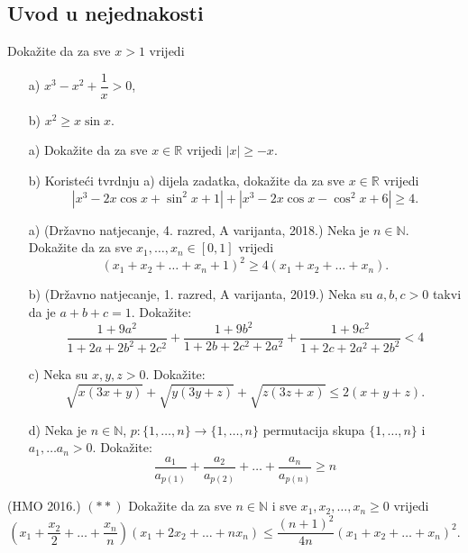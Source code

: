 \subsection*{Uvod u nejednakosti}
\begin{exercise}
Dokažite da za sve $x>1$ vrijedi 
\begin{itemize}
\item[a)] $x^3-x^2+\dfrac{1}{x}>0$,
\item[b)] $x^2\geq x\sin{x}$.
\end{itemize}
\end{exercise}
\begin{exercise} \textbf{}
\begin{itemize}
\item[a)] Dokažite da za sve $x\in \mathbb{R}$ vrijedi $|x|\geq -x$.
\item[b)] Koristeći tvrdnju a) dijela zadatka, dokažite da za sve $x\in \mathbb{R}$ vrijedi $$\left|x^{3}-2x\cos{x}+\sin^2{x}+1\right|+\left|x^{3}-2x\cos{x}-\cos^2{x}+6\right|\geq 4.$$ 
\end{itemize}
\end{exercise}
\begin{exercise} \textbf{}
\begin{itemize}
\item[a)] (Državno natjecanje, 4. razred, A varijanta, 2018.) Neka je $n\in \mathbb{N}$. Dokažite da za sve $x_1, \dots, x_n\in [0, 1]$ vrijedi
$$(x_1+x_2+\dots+x_n+1)^2\geq 4(x_1+x_2+\dots+x_n).$$
\item[b)] (Državno natjecanje, 1. razred, A varijanta, 2019.) Neka su $a, b, c>0$ takvi da je $a+b+c=1$. Dokažite:
$$\dfrac{1+9a^2}{1+2a+2b^2+2c^2}+\dfrac{1+9b^2}{1+2b+2c^2+2a^2}+\dfrac{1+9c^2}{1+2c+2a^2+2b^2}<4$$
\item[c)] Neka su $x, y, z>0$. Dokažite:
$$\sqrt{x(3x+y)}+\sqrt{y(3y+z)}+\sqrt{z(3z+x)} \leq 2(x+y+z).$$
\item[d)] Neka je $n\in \mathbb{N}$, $p : \{1, \dots, n\}\to \{1,\dots, n\}$ permutacija skupa $\{1, \dots, n\}$ i $a_1, \dots a_n>0$. Dokažite:
$$\dfrac{a_1}{a_{p(1)}}+\dfrac{a_2}{a_{p(2)}}+\dots+\dfrac{a_n}{a_{p(n)}}\geq n$$
\end{itemize}
\end{exercise}
\begin{exercise}(HMO 2016.) $(**)$
Dokažite da za sve $n\in \mathbb{N}$ i sve $x_1, x_2, \dots, x_n\geq 0$ vrijedi
$$\left(x_1+\dfrac{x_2}{2}+\dots+\dfrac{x_n}{n}\right)\left(x_1+2x_2+\dots+nx_n\right)\leq \dfrac{(n+1)^2}{4n}(x_1+x_2+\dots+x_n)^2.$$
\end{exercise}
